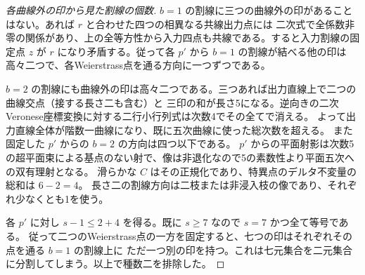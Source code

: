 \begin{proof}[各曲線外の印から見た割線の個数]
$b=1$ の割線に三つの曲線外の印があることはない。あれば $r$ と合わせた四つの相異なる共線出力点には
二次式で全係数非零の関係があり、上の全等方性から入力四点も共線である。すると入力割線の固定点 $z$ が
$r$ になり矛盾する。従って各 $p'$ から $b=1$ の割線が結べる他の印は高々二つで、各Weierstrass点を通る方向に一つずつである。

$b=2$ の割線にも曲線外の印は高々二つである。三つあれば出力直線上で二つの曲線交点（接する長さ二も含む）と
三印の和が長さ5になる。逆向きの二次Veronese座標変換に対する二行小行列式は次数4でその全てで消える。
よって出力直線全体が階数一曲線になり、既に五次曲線に使った総次数を超える。
また固定した $p'$ からの $b=2$ の方向は四つ以下である。
$p'$ からの平面射影は次数5の超平面束による基点のない射で、像は非退化なので5の素数性より平面五次への双有理射となる。
滑らかな $C$ はその正規化であり、特異点のデルタ不変量の総和は $6-2=4$。
長さ二の割線方向は二枝または非浸入枝の像であり、それぞれ少なくとも1を使う。

各 $p'$ に対し $s-1\le 2+4$ を得る。既に $s\ge7$ なので $s=7$ かつ全て等号である。
従って二つのWeierstrass点の一方を固定すると、七つの印はそれぞれその点を通る $b=1$ の割線上に
ただ一つ別の印を持つ。これは七元集合を二元集合に分割してしまう。以上で種数二を排除した。
\end{proof}
